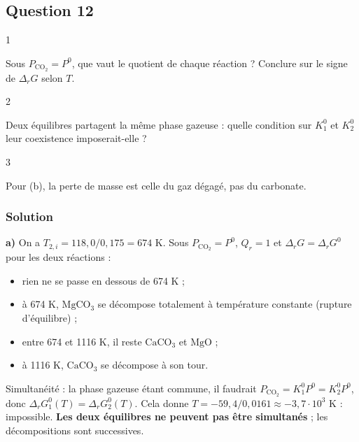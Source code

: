 \documentclass[11pt,a4paper]{article}
\providecommand{\tightlist}{\setlength{\itemsep}{0pt}\setlength{\parskip}{0pt}}
\begin{document}
\hypertarget{question-12}{%
\subsection{Question 12}\label{question-12}}

\begin{indication}{1}

Sous \(P_{\mathrm{CO_2}}=P^0\), que vaut le quotient de chaque réaction ? Conclure sur le signe de \(\Delta_rG\) selon \(T\).

\end{indication}

\begin{indication}{2}

Deux équilibres partagent la même phase gazeuse : quelle condition sur \(K_1^0\) et \(K_2^0\) leur coexistence imposerait-elle ?

\end{indication}

\begin{indication}{3}

Pour (b), la perte de masse est celle du gaz dégagé, pas du carbonate.

\end{indication}

\hypertarget{solution-11}{%
\subsubsection{Solution}\label{solution-11}}

\textbf{a)} On a \(T_{2,i}=118{,}0/0{,}175=674\) K. Sous \(P_{\mathrm{CO_2}}=P^0\), \(Q_r=1\) et \(\Delta_rG=\Delta_rG^0\) pour les deux réactions :

\begin{itemize}
\tightlist
\item
  rien ne se passe en dessous de 674 K ;
\item
  à 674 K, \(\mathrm{MgCO_3}\) se décompose totalement à température constante (rupture d'équilibre) ;
\item
  entre 674 et 1116 K, il reste \(\mathrm{CaCO_3}\) et \(\mathrm{MgO}\) ;
\item
  à 1116 K, \(\mathrm{CaCO_3}\) se décompose à son tour.
\end{itemize}

Simultanéité : la phase gazeuse étant commune, il faudrait \(P_{\mathrm{CO_2}}=K_1^0P^0=K_2^0P^0\), donc \(\Delta_rG_1^0(T)=\Delta_rG_2^0(T)\). Cela donne \(T=-59{,}4/0{,}0161\approx-3{,}7\cdot10^3\) K : impossible. \textbf{Les deux équilibres ne peuvent pas être simultanés} ; les décompositions sont successives.
\end{document}
